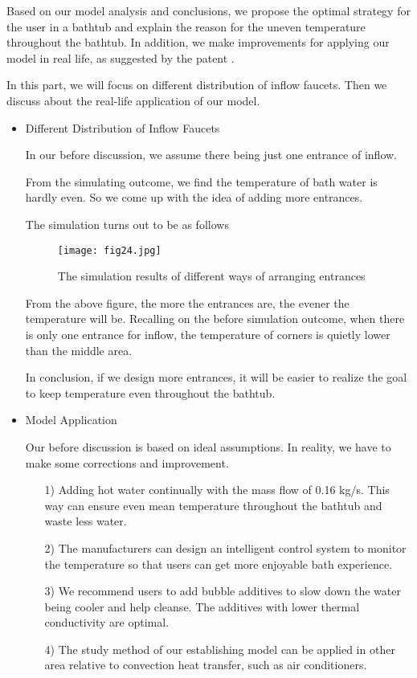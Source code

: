 \documentclass{mcmthesis}
\begin{document}
Based on our model analysis and conclusions, we propose the optimal strategy 
for the user in a bathtub and explain the reason for the uneven temperature 
throughout the bathtub. In addition, we make improvements for applying our 
model in real life, as suggested by the patent \textcite{patent2023}.

In this part, we will focus on different distribution of inflow faucets. Then we 
discuss about the real-life application of our model.

\begin{itemize}
\item Different Distribution of Inflow Faucets

In our before discussion, we assume there being just one entrance of inflow.

From the simulating outcome, we find the temperature of bath water is hardly even. 
So we come up with the idea of adding more entrances.

The simulation turns out to be as follows

\begin{figure}[h] 
\centering
\texttt{[image: fig24.jpg]}
\caption{The simulation results of different ways of arranging entrances} \label{fig24}
\end{figure}

From the above figure, the more the entrances are, the evener the temperature 
will be. Recalling on the before simulation outcome, when there is only one 
entrance for inflow, the temperature of corners is quietly lower than the middle 
area.

In conclusion, if we design more entrances, it will be easier to realize the goal 
to keep temperature even throughout the bathtub.

\item Model Application

Our before discussion is based on ideal assumptions. In reality, we have to make 
some corrections and improvement.

\begin{itemize}
\item[1)] Adding hot water continually with the mass flow of 0.16 kg/s. This way 
can ensure even mean temperature throughout the bathtub and waste less water.

\item[2)] The manufacturers can design an intelligent control system to monitor 
the temperature so that users can get more enjoyable bath experience.

\item[3)] We recommend users to add bubble additives to slow down the water being 
cooler and help cleanse. The additives with lower thermal conductivity are optimal.

\item[4)] The study method of our establishing model can be applied in other area 
relative to convection heat transfer, such as air conditioners.
\end{itemize}
\end{itemize}
\end{document}
